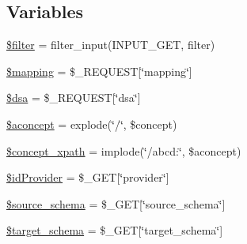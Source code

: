 \subsection*{Variables}
\begin{DoxyCompactItemize}
\item 
\hyperlink{namespace_consistency_aac53bdb48bdd96ff9c20e2a86f48ce5f}{\$filter} = filter\+\_\+input(I\+N\+P\+U\+T\+\_\+\+G\+ET, \textquotesingle{}filter\textquotesingle{})
\item 
\hyperlink{namespace_consistency_a2c93d0b89d7eadb6b8dfb7c83bc991f9}{\$mapping} = \$\+\_\+\+R\+E\+Q\+U\+E\+ST\mbox{[}\char`\"{}mapping\char`\"{}\mbox{]}
\item 
\hyperlink{namespace_consistency_aca6ad28ee812df74bbd827a9d244055e}{\$dsa} = \$\+\_\+\+R\+E\+Q\+U\+E\+ST\mbox{[}\char`\"{}dsa\char`\"{}\mbox{]}
\item 
\hyperlink{namespace_consistency_a7ab539c1f2610226e15527ae9f66d1b4}{\$aconcept} = explode(\char`\"{}/\char`\"{}, \$concept)
\item 
\hyperlink{namespace_consistency_a6de4812dd264c558f2dadf3ae20b1da2}{\$concept\+\_\+xpath} = implode(\char`\"{}/abcd\+:\char`\"{}, \$aconcept)
\item 
\hyperlink{namespace_consistency_a7c95ff52e91cdd46d783255e270c6d7f}{\$id\+Provider} = \$\+\_\+\+G\+ET\mbox{[}\char`\"{}provider\char`\"{}\mbox{]}
\item 
\hyperlink{namespace_consistency_ae760b4b690dd68b19e3624cdaddb5ad1}{\$source\+\_\+schema} = \$\+\_\+\+G\+ET\mbox{[}\char`\"{}source\+\_\+schema\char`\"{}\mbox{]}
\item 
\hyperlink{namespace_consistency_a43945d5f5c2b8601a121f40a2db7b5b2}{\$target\+\_\+schema} = \$\+\_\+\+G\+ET\mbox{[}\char`\"{}target\+\_\+schema\char`\"{}\mbox{]}
\end{DoxyCompactItemize}


